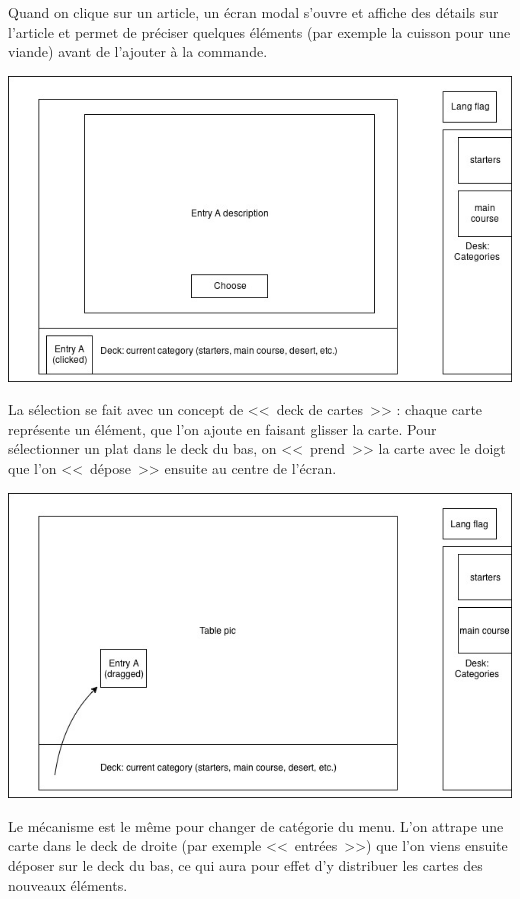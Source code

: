 \documentclass[a4paper,12pt]{article}
\begin{document}
Quand on clique sur un article, un écran modal s'ouvre et affiche des détails sur l'article et permet de préciser
quelques éléments (par exemple la cuisson pour une viande) avant de l'ajouter à la commande.

\begin{center}
	\includegraphics[width=\textwidth]{in_place_screen2.jpg}
\end{center}

La sélection se fait avec un concept de <<~deck de cartes~>> : chaque carte représente un élément, que l'on ajoute
en faisant glisser la carte. Pour sélectionner un plat dans le deck du bas, on <<~prend~>> la carte avec le doigt que
l'on <<~dépose~>> ensuite au centre de l'écran.

\begin{center}
	\includegraphics[width=\textwidth]{in_place_drag.jpg}
\end{center}

Le mécanisme est le même pour changer de catégorie du menu. L'on attrape une carte dans le deck de droite (par
exemple <<~entrées~>>) que l'on viens ensuite déposer sur le deck du bas, ce qui aura pour effet d'y distribuer
les cartes des nouveaux éléments.
\end{document}
